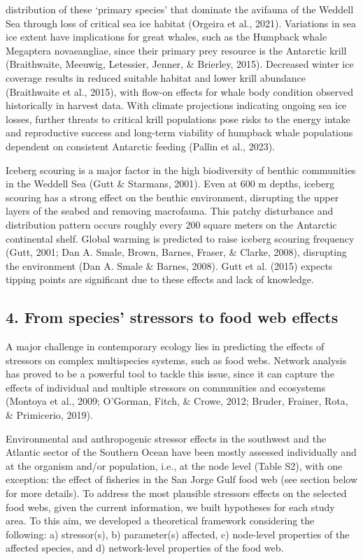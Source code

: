\documentclass[
]{article}
\begin{document}
distribution of these `primary species' that dominate the avifauna of
the Weddell Sea through loss of critical sea ice habitat (Orgeira et
al., 2021). Variations in sea ice extent have implications for great
whales, such as the Humpback whale Megaptera novaeangliae, since their
primary prey resource is the Antarctic krill (Braithwaite, Meeuwig,
Letessier, Jenner, \& Brierley, 2015). Decreased winter ice coverage
results in reduced suitable habitat and lower krill abundance
(Braithwaite et al., 2015), with flow-on effects for whale body
condition observed historically in harvest data. With climate
projections indicating ongoing sea ice losses, further threats to
critical krill populations pose risks to the energy intake and
reproductive success and long-term viability of humpback whale
populations dependent on consistent Antarctic feeding (Pallin et al.,
2023).

Iceberg scouring is a major factor in the high biodiversity of benthic
communities in the Weddell Sea (Gutt \& Starmans, 2001). Even at 600 m
depths, iceberg scouring has a strong effect on the benthic environment,
disrupting the upper layers of the seabed and removing macrofauna. This
patchy disturbance and distribution pattern occurs roughly every 200
square meters on the Antarctic continental shelf. Global warming is
predicted to raise iceberg scouring frequency (Gutt, 2001; Dan A. Smale,
Brown, Barnes, Fraser, \& Clarke, 2008), disrupting the environment (Dan
A. Smale \& Barnes, 2008). Gutt et al. (2015) expects tipping points are
significant due to these effects and lack of knowledge.

\hypertarget{from-species-stressors-to-food-web-effects}{%
\subsection{4. From species' stressors to food web
effects}\label{from-species-stressors-to-food-web-effects}}

A major challenge in contemporary ecology lies in predicting the effects
of stressors on complex multispecies systems, such as food webs. Network
analysis has proved to be a powerful tool to tackle this issue, since it
can capture the effects of individual and multiple stressors on
communities and ecosystems (Montoya et al., 2009; O'Gorman, Fitch, \&
Crowe, 2012; Bruder, Frainer, Rota, \& Primicerio, 2019).

Environmental and anthropogenic stressor effects in the southwest and
the Atlantic sector of the Southern Ocean have been mostly assessed
individually and at the organism and/or population, i.e., at the node
level (Table S2), with one exception: the effect of fisheries in the San
Jorge Gulf food web (see section below for more details). To address the
most plausible stressors effects on the selected food webs, given the
current information, we built hypotheses for each study area. To this
aim, we developed a theoretical framework considering the following: a)
stressor(s), b) parameter(s) affected, c) node-level properties of the
affected species, and d) network-level properties of the food web.
\end{document}
